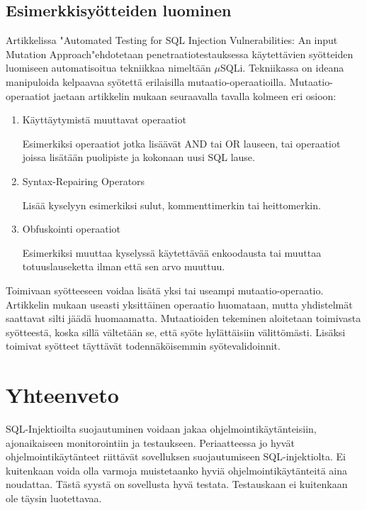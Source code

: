 \documentclass[finnish]{tktltiki2}
\theoremstyle{definition}
\theoremstyle{remark}
\begin{document}
	\subsection{Esimerkkisyötteiden luominen}
	Artikkelissa "Automated Testing for SQL Injection Vulnerabilities: An input Mutation Approach"\cite{generation}\space ehdotetaan penetraatiotestauksessa käytettävien syötteiden luomiseen automatisoitua tekniikkaa nimeltään $\mu$SQLi. Tekniikassa on ideana manipuloida kelpaavaa syötettä erilaisilla mutaatio-operaatioilla. Mutaatio-operaatiot jaetaan artikkelin mukaan seuraavalla tavalla kolmeen eri osioon:
	\begin{enumerate}
	\item Käyttäytymistä muuttavat operaatiot
	
	Esimerkiksi operaatiot jotka lisäävät AND tai OR lauseen, tai operaatiot joissa lisätään puolipiste ja kokonaan uusi SQL lause. 
	
	\item Syntax-Repairing Operators
	
	Lisää kyselyyn esimerkiksi sulut, kommenttimerkin tai heittomerkin.
	
	\item Obfuskointi operaatiot
	
	Esimerkiksi muuttaa kyselyssä käytettävää enkoodausta tai muuttaa totuuslauseketta ilman että sen arvo muuttuu.
	\end{enumerate}
	
	Toimivaan syötteeseen voidaa lisätä yksi tai useampi mutaatio-operaatio. Artikkelin mukaan useasti yksittäinen operaatio huomataan, mutta yhdistelmät saattavat silti jäädä huomaamatta. Mutaatioiden tekeminen aloitetaan toimivasta syötteestä, koska sillä vältetään se, että syöte hylättäisiin välittömästi. Lisäksi toimivat syötteet täyttävät todennäköisemmin syötevalidoinnit. 
	
	
	
	\section {Yhteenveto}
	SQL-Injektioilta suojautuminen voidaan jakaa ohjelmointikäytänteisiin, ajonaikaiseen monitorointiin ja testaukseen. Periaatteessa jo hyvät ohjelmointikäytänteet riittävät sovelluksen suojautumiseen SQL-injektiolta. Ei kuitenkaan voida olla varmoja muistetaanko hyviä ohjelmointikäytänteitä aina noudattaa. Tästä syystä on sovellusta hyvä testata. Testauskaan ei kuitenkaan ole täysin luotettavaa.
	
\end{document}

